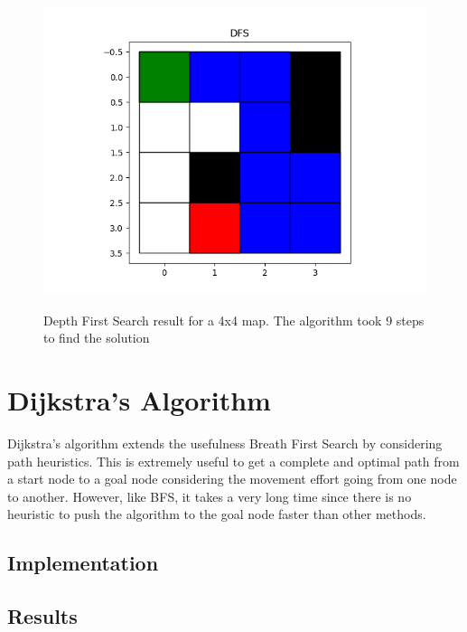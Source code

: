 \documentclass[journal]{IEEEtran}
\begin{document}
    \begin{figure}[ht]
        \includegraphics[width=\linewidth]{figures/DFS_SmallMap_Path.png}
        \label{fig:Dijkstra_Weights_Example}
        \caption{Depth First Search result for a 4x4 map. The algorithm took 9 steps to find the solution}
    \end{figure} 

    \section{Dijkstra's Algorithm} \label{Dijkstra}
    Dijkstra's algorithm extends the usefulness Breath First Search by considering path heuristics. This is extremely useful to get a complete and optimal path from a start node to a goal node considering the movement effort going from one node to another. However, like BFS, it takes a very long time since there is no heuristic to push the algorithm to the goal node faster than other methods.

    \subsection{Implementation}
    
    \subsection{Results}
\end{document}
